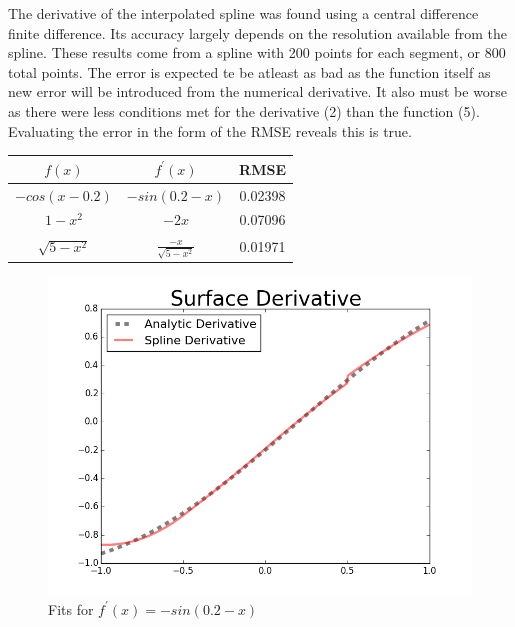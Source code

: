 \documentclass[12pt]{article}
\begin{document}
  The derivative of the interpolated spline was found using a central difference
  finite difference. Its accuracy largely depends on the resolution available
  from the spline. These results come from a spline with 200 points for each
  segment, or 800 total points.
  The error is expected te be atleast as bad as the function itself as new
  error will be introduced from the numerical derivative. It also must be worse
  as there were less conditions met for the derivative (2) than the function (5).
  Evaluating the error in the form of the RMSE reveals this is true.

  \centering
  \begin{tabular}{| c | c | c |}
    \hline
    $f(x)$         & $f^\prime(x)$             & RMSE     \\ \hline
    $-cos(x-0.2)$  & $-sin(0.2-x)$             & 0.02398    \\
    $1-x^2$        & $-2x$                     & 0.07096   \\
    $\sqrt{5-x^2}$ & $\frac{-x}{\sqrt{5-x^2}}$ & 0.01971    \\ \hline
  \end{tabular}

  \begin{figure}[h!]
    \centering
    \includegraphics[scale=0.75]{cosderiv.png}
    \caption{Fits for $f^\prime(x)=-sin(0.2-x)$}
  \end{figure}
\end{document}
